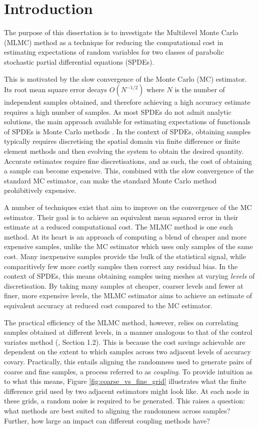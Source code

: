\chapter{Introduction}\label{sec:intro}

The purpose of this dissertation is to investigate the 
Multilevel Monte Carlo (MLMC) method as a technique for reducing 
the computational cost in estimating expectations of random variables 
for two classes of parabolic stochastic partial differential equations (SPDEs).

This is motivated by the slow convergence of the Monte Carlo 
(MC) estimator. Its root mean square error 
decays $O(N^{-1/2})$ where $N$ is the number 
of independent samples obtained, and therefore achieving a high accuracy 
estimate requires a high number of samples. As most SPDEs do not admit 
analytic solutions, the main approach available for estimating expectations of 
functionals of SPDEs is Monte Carlo methods \cite{giles2015multilevel}. In the context
of SPDEs, obtaining samples typically requires discretising 
the spatial domain via finite difference or finite element methods
and then evolving the system to obtain the desired quantity. Accurate 
estimates require fine discretisations, and as such, the cost of obtaining 
a sample can become expensive. This, combined with the slow convergence of the 
standard MC estimator, can make the standard Monte Carlo method prohibitively
expensive.

A number of techniques exist that aim to improve on the convergence of 
the MC estimator. Their goal is to achieve an equivalent mean squared error
in their estimate at a reduced computational cost. The MLMC method is one 
such method. At its heart is an approach of computing a blend of cheaper 
and more expensive samples, unlike the MC estimator which uses only samples 
of the same cost. Many inexpensive samples provide the bulk of the statistical signal, 
while comparitively few more costly samples then correct any residual bias.
In the context of SPDEs, this means obtaining samples using meshes at 
varying \textit{levels} of discretisation. By taking many samples at cheaper,
coarser levels and fewer at finer, more expensive levels, the MLMC 
estimator aims to achieve an estimate of equivalent accuracy at reduced cost
compared to the MC estimator.

The practical efficiency of the MLMC method, however, relies on correlating 
samples obtained at different levels, in a manner analogous to that of the 
control variates method (\cite{giles2015multilevel}, Section 1.2). 
This is because the cost savings achievable are dependent on the extent to which 
samples across two adjacent levels of accuracy covary. Practically, this 
entails aligning the randomness used to generate pairs of coarse and 
fine samples, a process referred to as \textit{coupling}.
To provide intuition as to what this means, Figure
\ref{fig:coarse_vs_fine_grid} illustrates what the finite difference 
grid used by two adjacent estimators might look like. At each 
node in these grids, a random noise is required to be generated. 
This raises a question: what methods are best suited to aligning the 
randomness across samples? Further, how large an impact 
can different coupling methods have?

